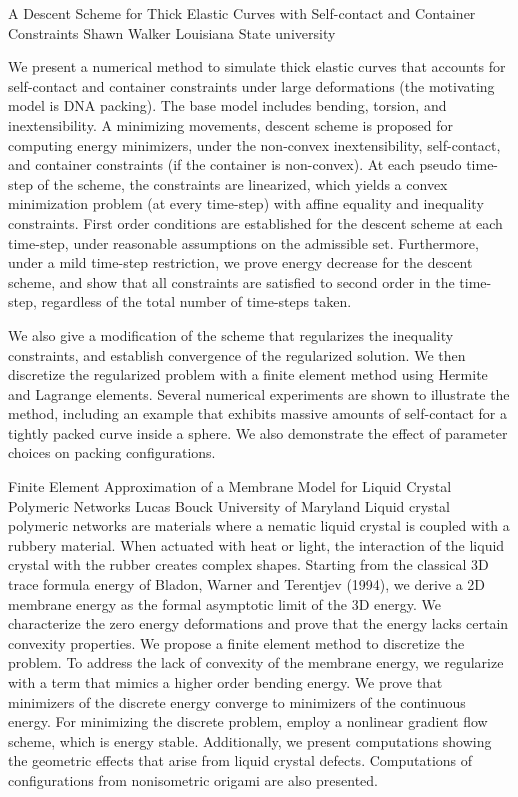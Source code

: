 \begin{addmargin}[2em]{0em}
\vspace{2ex}
\abs
{A Descent Scheme for Thick Elastic Curves with Self-contact and Container Constraints}
{Shawn Walker}
{Louisiana State university}
{We present a numerical method to simulate thick elastic curves that accounts for self-contact and container constraints under large deformations (the motivating model is DNA packing). The base model includes bending, torsion, and inextensibility. A minimizing movements, descent scheme is proposed for computing energy minimizers, under the non-convex inextensibility, self-contact, and container constraints (if the container is non-convex). At each pseudo time-step of the scheme, the constraints are linearized, which yields a convex minimization problem (at every time-step) with affine equality and inequality constraints. First order conditions are established for the descent scheme at each time-step, under reasonable assumptions on the admissible set. Furthermore, under a mild time-step restriction, we prove energy decrease for the descent scheme, and show that all constraints are satisfied to second order in the time-step, regardless of the total number of time-steps taken.

We also give a modification of the scheme that regularizes the inequality constraints, and establish convergence of the regularized solution. We then discretize the regularized problem with a finite element method using Hermite and Lagrange elements. Several numerical experiments are shown to illustrate the method, including an example that exhibits massive amounts of self-contact for a tightly packed curve inside a sphere.  We also demonstrate the effect of parameter choices on packing configurations.
}


\vspace{1.5ex}
\abs
{Finite Element Approximation of a Membrane Model for Liquid Crystal Polymeric Networks}
{Lucas Bouck}
{University of Maryland}
{Liquid crystal polymeric networks are materials where a nematic liquid crystal is coupled with a rubbery material. When actuated with heat or light, the interaction of the liquid crystal with the rubber creates complex shapes. Starting from the classical 3D trace formula energy of Bladon, Warner and Terentjev (1994), we derive a 2D membrane energy as the formal asymptotic limit of the 3D energy. We characterize the zero energy deformations and prove that the energy lacks certain convexity properties. We propose a finite element method to discretize the problem. To address the lack of convexity of the membrane energy, we regularize with a term that mimics a higher order bending energy. We prove that minimizers of the discrete energy converge to minimizers of the continuous energy. For minimizing the discrete problem, employ a nonlinear gradient flow scheme, which is energy stable. Additionally, we present computations showing the geometric effects that arise from liquid crystal defects. Computations of configurations from nonisometric origami are also presented.
}



\end{addmargin}

